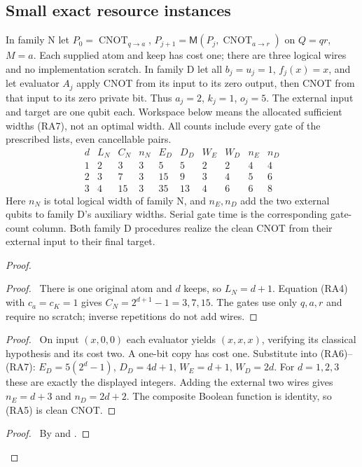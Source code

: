 \subsection{Small exact resource instances}

\begin{example}
\label{ex:resA-counts}
In family N let $P_0=\operatorname{CNOT}_{q\to a}$,
$P_{j+1}=\mathsf M(P_j,\operatorname{CNOT}_{a\to r})$ on
$Q=qr$, $M=a$. Each supplied atom and keep has cost one; there
are three logical wires and no implementation scratch.
In family D let all $b_j=u_j=1$, $f_j(x)=x$, and let evaluator $A_j$
apply CNOT from its input to its zero output, then CNOT from that input
to its zero private bit. Thus $a_j=2$, $k_j=1$, $o_j=5$.
The external input and target are one qubit each. Workspace below means
the allocated sufficient widths (RA7), not an optimal width. All counts
include every gate of the prescribed lists, even cancellable pairs.
\[
\begin{array}{c|rrr|rrrr|rr}
 d& L_N&C_N&n_N&E_D&D_D&W_E&W_D&n_E&n_D\\\hline
 1&2&3 &3& 5 &5 &2&2&4&4\\
 2&3&7 &3&15 &9 &3&4&5&6\\
 3&4&15&3&35&13 &4&6&6&8
\end{array}                                         \tag{RA15}
\]
Here $n_N$ is total logical width of family N, and $n_E,n_D$ add the
two external qubits to family D's auxiliary widths. Serial gate time
is the corresponding gate-count column. Both family D procedures
realize the clean CNOT from their external input to their final target.
\end{example}
\begin{proof}
 \begin{proof}\pf\ There is one original atom and $d$ keeps, so
 $L_N=d+1$. Equation (RA4) with $c_a=c_K=1$ gives
 $C_N=2^{d+1}-1=3,7,15$. The gates use only $q,a,r$ and require
 no scratch; inverse repetitions do not add wires.\end{proof}
 \begin{proof}\pf\ On input $(x,0,0)$ each evaluator yields
 $(x,x,x)$, verifying its classical hypothesis and its cost two.
 A one-bit copy has cost one. Substitute into (RA6)--(RA7):
 $E_D=5(2^d-1)$, $D_D=4d+1$, $W_E=d+1$, $W_D=2d$.
 For $d=1,2,3$ these are exactly the displayed integers.
 Adding the external two wires gives $n_E=d+3$ and $n_D=2d+2$.
 The composite Boolean function is identity, so (RA5) is clean CNOT.
 \end{proof}
 \qedstep
 \begin{proof}\pf\ By  and .
 \end{proof}
\end{proof}

